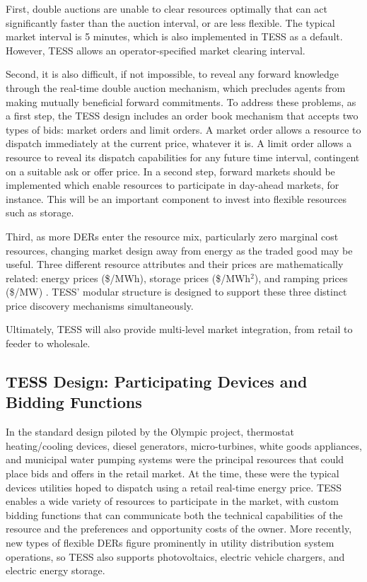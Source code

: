 First, double auctions are unable to clear resources optimally that can act significantly faster than the auction interval, or are less flexible. The typical market interval is 5 minutes, which is also implemented in TESS as a default. However, TESS allows an operator-specified market clearing interval.

Second, it is also difficult, if not impossible, to reveal any forward knowledge through the real-time double auction  mechanism, which precludes agents from making mutually beneficial forward commitments. To address these problems, as a first step, the TESS design includes an order book mechanism that accepts two types of bids: market orders and limit orders. A market order allows a resource to dispatch immediately at the current price, whatever it is. A limit order allows a resource to reveal its dispatch capabilities for any future time interval, contingent on a suitable ask or offer price. 
In a second step, forward markets should be implemented which enable resources to participate in day-ahead markets, for instance. This will be an important component to invest into flexible resources such as storage.

Third, as more DERs enter the resource mix, particularly zero marginal cost resources, changing market design away from energy as the traded good may be useful. Three different resource attributes and their prices are mathematically related: energy prices (\$/MWh), storage prices (\$/MWh$^2$), and ramping prices (\$/MW) \citep{chassin2017thesis}. TESS' modular structure is designed to support these three distinct price discovery mechanisms simultaneously. 

Ultimately, TESS will also provide multi-level market integration, from retail to feeder to wholesale.

\subsection{TESS Design: Participating Devices and Bidding Functions}\label{sec:devices}

In the standard design piloted by the Olympic project, thermostat heating/cooling devices, diesel generators, micro-turbines, white goods appliances, and municipal water pumping systems were the principal resources that could place bids and offers in the retail market.  At the time, these were the typical devices utilities hoped to dispatch using a retail real-time energy price. 
TESS enables a wide variety of resources to participate in the market, with custom bidding functions that can communicate both the technical capabilities of the resource and the preferences and opportunity costs of the owner.
More recently, new types of flexible DERs figure prominently in utility distribution system operations, so TESS also supports photovoltaics, electric vehicle chargers, and electric energy storage.

